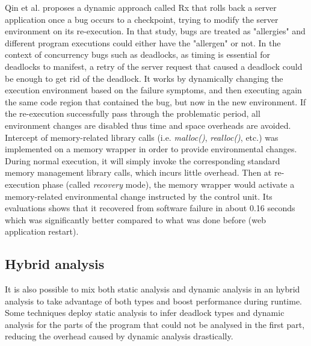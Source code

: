 Qin et al. \cite{rx} proposes a dynamic approach called Rx that rolls back a server application once a bug occurs to a checkpoint,
trying to modify the server environment on its re-execution. In that study, bugs are treated as "allergies" and different program executions
could either have the "allergen" or not. In the context of concurrency bugs such as deadlocks, as timing is essential for deadlocks to manifest,
a retry of the server request that caused a deadlock could be enough to get rid of the deadlock.
It works by dynamically changing the execution environment based on the failure symptoms, and then
executing again the same code region that contained the bug, but now in the new environment.
If the re-execution successfully pass through the problematic period,
all environment changes are disabled thus time and space overheads are avoided.
Intercept of memory-related library calls (i.e. \emph{malloc()}, \emph{realloc()}, etc.) was implemented on a memory wrapper
in order to provide environmental changes. During normal execution, it will simply invoke the corresponding
standard memory management library calls, which incurs little overhead. Then at re-execution phase (called \emph{recovery} mode), the memory wrapper would activate
a memory-related environmental change instructed by the control unit. Its evaluations shows that it recovered from software failure in about 0.16 seconds which was
significantly better compared to what was done before (web application restart).

\subsection{Hybrid analysis}

It is also possible to mix both static analysis and dynamic analysis in an hybrid analysis to take advantage of both types and boost performance during runtime.
Some techniques deploy static analysis to infer deadlock types and dynamic analysis for the parts of the program that could not be analysed in the first part,
reducing the overhead caused by dynamic analysis drastically.


